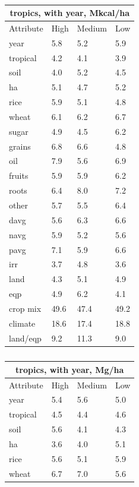 \documentclass[12pt]{article}
\begin{document}
\begin{table}[h!]
\parbox{.45\linewidth} {
\centering
\begin{tabular}{llll}
\toprule
\multicolumn{4}{c}{\textbf{tropics, with year, Mkcal/ha}} \\
\midrule
Attribute & High & Medium & Low \\
\midrule
year & 5.8 & 5.2 & 5.9 \\
tropical & 4.2 & 4.1 & 3.9 \\
soil & 4.0 & 5.2 & 4.5 \\
ha & 5.1 & 4.7 & 5.2 \\
rice & 5.9 & 5.1 & 4.8 \\
wheat & 6.1 & 6.2 & 6.7 \\
sugar & 4.9 & 4.5 & 6.2 \\
grains & 6.8 & 6.6 & 4.8 \\
oil & 7.9 & 5.6 & 6.9 \\
fruits & 5.9 & 5.9 & 6.2 \\
roots & 6.4 & 8.0 & 7.2 \\
other & 5.7 & 5.5 & 6.4 \\
davg & 5.6 & 6.3 & 6.6 \\
navg & 5.9 & 5.2 & 5.6 \\
pavg & 7.1 & 5.9 & 6.6 \\
irr & 3.7 & 4.8 & 3.6 \\
land & 4.3 & 5.1 & 4.9 \\
eqp & 4.9 & 6.2 & 4.1 \\
\midrule
crop mix & 49.6 & 47.4 & 49.2 \\
climate & 18.6 & 17.4 & 18.8 \\
land/eqp & 9.2 & 11.3 & 9.0 \\
\bottomrule
\end{tabular}
\caption{ }
\label{k.wy.trop_percentages}
}
\parbox{.45\linewidth} {
\centering
\begin{tabular}{llll}
\toprule
\multicolumn{4}{c}{\textbf{tropics, with year, Mg/ha}} \\
\midrule
Attribute & High & Medium & Low \\
\midrule
year & 5.4 & 5.6 & 5.0 \\
tropical & 4.5 & 4.4 & 4.6 \\
soil & 5.6 & 4.1 & 4.3 \\
ha & 3.6 & 4.0 & 5.1 \\
rice & 5.6 & 5.1 & 5.9 \\
wheat & 6.7 & 7.0 & 5.6 \\

\end{tabular}}
\end{table}
\end{document}
